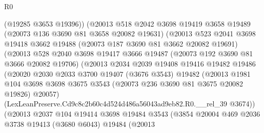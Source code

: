 \begin{lexlean}{R0}
\begin{coremodule}
                        (@19285 @3653 @19396))
                      (@20013
                        @518
                        @2042
                        @3698
                        @19419
                        @3658
                        @19489
                        (@20073 @136 @3690 @81 @3658 @20082 @19631)
                        (@20013
                          @523
                          @2041
                          @3698
                          @19418
                          @3662
                          @19488
                          (@20073 @187 @3690 @81 @3662 @20082 @19691)
                          (@20013
                            @528
                            @2040
                            @3698
                            @19417
                            @3666
                            @19487
                            (@20073 @192 @3690 @81 @3666 @20082 @19706)
                            (@20013
                              @2034
                              @2039
                              @19408
                              @19416
                              @19482
                              @19486
                              (@20020
                                @2030
                                @2033
                                @3700
                                @19407
                                (@3676 @3543)
                                @19482
                                (@20013
                                  @1981
                                  @104
                                  @3698
                                  @3698
                                  @3675
                                  @3543
                                  (@20073 @236 @3690 @81 @3675 @20082 @19826)
                                  @20057)
                                (LexLeanPreserve.Cd9c8c2b60c4d524d486a56043ad9eb82.R0.__rel_39
                                  @3674))
                              (@20013
                                @2037
                                @104
                                @19414
                                @3698
                                @19484
                                @3543
                                (@3854
                                  @20004
                                  @469
                                  @2036
                                  @3738
                                  @19413
                                  (@3680 @6043)
                                  @19484
                                  (@20013

\end{coremodule}
\end{lexlean}
